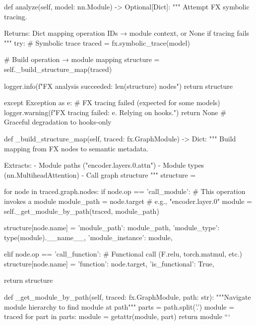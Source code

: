     def analyze(self, model: nn.Module) -> Optional[Dict]:
        """
        Attempt FX symbolic tracing.
        
        Returns:
            Dict mapping operation IDs → module context, or None if tracing fails
        """
        try:
            # Symbolic trace
            traced = fx.symbolic_trace(model)
            
            # Build operation → module mapping
            structure = self._build_structure_map(traced)
            
            logger.info(f"FX analysis succeeded: {len(structure)} nodes")
            return structure
        
        except Exception as e:
            # FX tracing failed (expected for some models)
            logger.warning(f"FX tracing failed: {e}. Relying on hooks.")
            return None  # Graceful degradation to hooks-only
    
    def _build_structure_map(self, traced: fx.GraphModule) -> Dict:
        """
        Build mapping from FX nodes to semantic metadata.
        
        Extracts:
        - Module paths ("encoder.layers.0.attn")
        - Module types (nn.MultiheadAttention)
        - Call graph structure
        """
        structure = {}
        
        for node in traced.graph.nodes:
            if node.op == 'call_module':
                # This operation invokes a module
                module_path = node.target  # e.g., "encoder.layer.0"
                module = self._get_module_by_path(traced, module_path)
                
                structure[node.name] = {
                    'module_path': module_path,
                    'module_type': type(module).__name__,
                    'module_instance': module,
                }
            
            elif node.op == 'call_function':
                # Functional call (F.relu, torch.matmul, etc.)
                structure[node.name] = {
                    'function': node.target,
                    'is_functional': True,
                }
        
        return structure
    
    def _get_module_by_path(self, traced: fx.GraphModule, path: str):
        """Navigate module hierarchy to find module at path"""
        parts = path.split('.')
        module = traced
        for part in parts:
            module = getattr(module, part)
        return module
```

